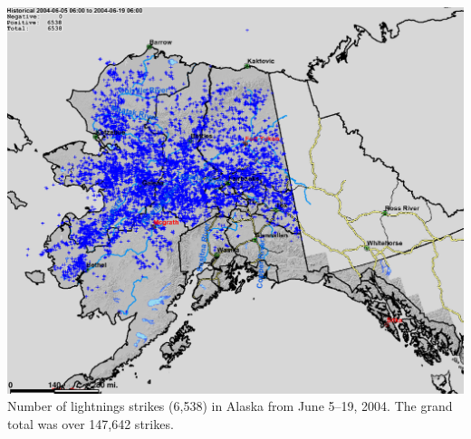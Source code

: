 \documentclass{beamer}
\begin{document}
\begin{frame}
\begin{columns}[T]
\begin{column}{.5\textwidth}
\includegraphics[width=1.00\textwidth]{figs/lighting_ak}
   \\
   \tiny 
    Number of lightnings strikes (6,538) in Alaska from June 5--19, 2004. 
    The grand total was over 147,642 strikes. 
    \end{column}
\end{columns}
\end{frame} 
\end{document}
